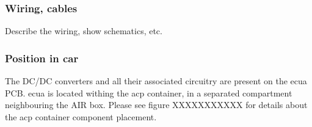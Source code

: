 \subsubsection{Wiring, cables}
Describe the wiring, show schematics, etc.

\subsubsection{Position in car}
The DC/DC converters and all their associated circuitry are present on the \gls{ecua} PCB. \gls{ecua} is located withing the \gls{acp} container, in a separated compartment neighbouring the AIR box. Please see figure XXXXXXXXXXX for details about the \gls{acp} container component placement.